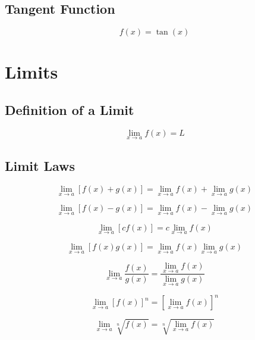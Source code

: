 \documentclass{book}
\begin{document}
\subsection{Tangent Function}
\begin{equation}
    f(x) = \tan(x)
\end{equation}

\section{Limits}
\subsection{Definition of a Limit}
\begin{equation}
    \lim_{x \to a} f(x) = L
\end{equation}

\subsection{Limit Laws}
\begin{equation}
    \lim_{x \to a} [f(x) + g(x)] = \lim_{x \to a} f(x) + \lim_{x \to a} g(x)
\end{equation}

\begin{equation}
    \lim_{x \to a} [f(x) - g(x)] = \lim_{x \to a} f(x) - \lim_{x \to a} g(x)
\end{equation}

\begin{equation}
    \lim_{x \to a} [cf(x)] = c \lim_{x \to a} f(x)
\end{equation}

\begin{equation}
    \lim_{x \to a} [f(x)g(x)] = \lim_{x \to a} f(x) \lim_{x \to a} g(x)
\end{equation}

\begin{equation}
    \lim_{x \to a} \frac{f(x)}{g(x)} = \frac{\lim_{x \to a} f(x)}{\lim_{x \to a} g(x)}
\end{equation}

\begin{equation}
    \lim_{x \to a} [f(x)]^n = [\lim_{x \to a} f(x)]^n
\end{equation}

\begin{equation}
    \lim_{x \to a} \sqrt[n]{f(x)} = \sqrt[n]{\lim_{x \to a} f(x)}
\end{equation}
\end{document}
